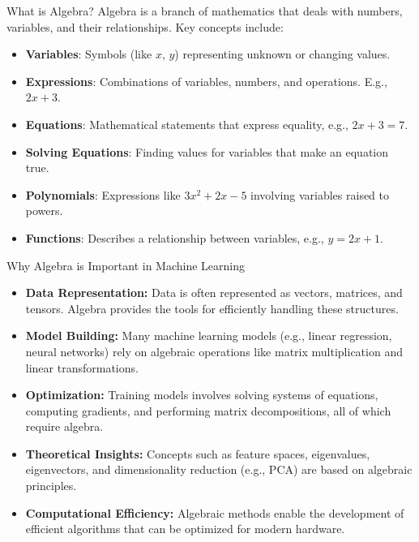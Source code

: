   \begin{frame}{What is Algebra?}
    Algebra is a branch of mathematics that deals with numbers, variables, and their relationships. Key concepts include:
    \begin{itemize}
        \item \textbf{Variables}: Symbols (like \( x \), \( y \)) representing unknown or changing values.
        \item \textbf{Expressions}: Combinations of variables, numbers, and operations. E.g., \( 2x + 3 \).
        \item \textbf{Equations}: Mathematical statements that express equality, e.g., \( 2x + 3 = 7 \).
        \item \textbf{Solving Equations}: Finding values for variables that make an equation true.
        \item \textbf{Polynomials}: Expressions like \( 3x^2 + 2x - 5 \) involving variables raised to powers.
        \item \textbf{Functions}: Describes a relationship between variables, e.g., \( y = 2x + 1 \).
    \end{itemize}
\end{frame}
\begin{frame}{Why Algebra is Important in Machine Learning}
 
    \begin{itemize}
      \item \textbf{Data Representation:}  
      Data is often represented as vectors, matrices, and tensors. Algebra provides the tools for efficiently handling these structures.
      \item \textbf{Model Building:}  
      Many machine learning models (e.g., linear regression, neural networks) rely on algebraic operations like matrix multiplication and linear transformations.
      \item \textbf{Optimization:}  
      Training models involves solving systems of equations, computing gradients, and performing matrix decompositions, all of which require algebra.
      \item \textbf{Theoretical Insights:}  
      Concepts such as feature spaces, eigenvalues, eigenvectors, and dimensionality reduction (e.g., PCA) are based on algebraic principles.
      \item \textbf{Computational Efficiency:}  
      Algebraic methods enable the development of efficient algorithms that can be optimized for modern hardware.
    \end{itemize}
 
\end{frame}


